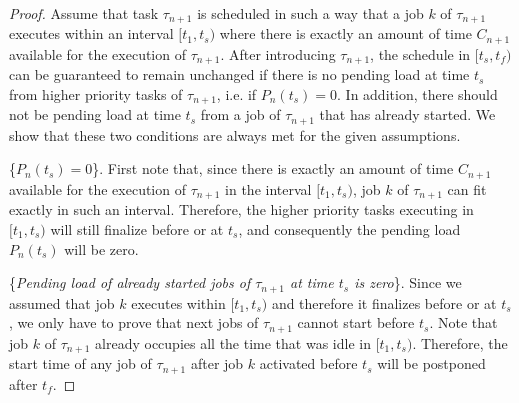 \documentclass[fleqn]{article}
\begin{document}
\begin{proof}
	
	Assume that task $\tau_{n+1}$ is scheduled in such a way that a job $k$ of $\tau_{n+1}$ executes within an interval $[t_1,t_s)$ where there is exactly an amount of time $C_{n+1}$ available for the execution of $\tau_{n+1}$. After introducing $\tau_{n+1}$, the schedule in $[t_s,t_f)$ can be guaranteed to remain unchanged if there is no pending load at time $t_s$ from higher priority tasks of $\tau_{n+1}$, i.e. if $P_{n}(t_s)=0$. In addition, there should not be pending load at time $t_s$ from a job of $\tau_{n+1}$ that has already started. We show that these two conditions are always met for the given assumptions.
	
	
	\{$P_{n}(t_s)=0$\}.
	First note that, since there is exactly an amount of time $C_{n+1}$ available for the execution of $\tau_{n+1}$ in the interval $[t_1,t_s)$, job $k$ of $\tau_{n+1}$ can fit exactly in such an interval. Therefore, the higher priority tasks executing in $[t_1,t_s)$ will still finalize before or at $t_s$, and consequently the pending load $P_{n}(t_s)$ will be zero.
	
	\{\textit{Pending load of already started jobs of $\tau_{n+1}$ at time $t_s$ is zero}\}.
	Since we assumed that job $k$ executes within $[t_1,t_s)$ and therefore it finalizes before or at $t_s$, we only have to prove that next jobs of $\tau_{n+1}$ cannot start before $t_s$. Note that job $k$ of $\tau_{n+1}$ already occupies all the time that was idle in $[t_1,t_s)$. Therefore, the start time of any job of $\tau_{n+1}$ after job $k$ activated before $t_s$ will be postponed after $t_f$.
	
	
	
\end{proof}
\end{document}
